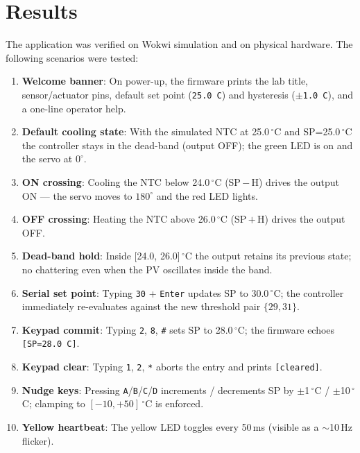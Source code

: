 \documentclass[12pt]{article}
\begin{document}
\section{Results}\label{sec:results}

The application was verified on Wokwi simulation and on physical hardware. The following scenarios were tested:
\begin{enumerate}
  \item \textbf{Welcome banner}: On power-up, the firmware prints the lab title, sensor/actuator pins, default set point (\texttt{25.0\,C}) and hysteresis (\texttt{$\pm$1.0\,C}), and a one-line operator help.
  \item \textbf{Default cooling state}: With the simulated NTC at 25.0\,$^{\circ}$C and SP=25.0\,$^{\circ}$C the controller stays in the dead-band (output OFF); the green LED is on and the servo at $0^{\circ}$.
  \item \textbf{ON crossing}: Cooling the NTC below 24.0\,$^{\circ}$C (SP\,$-$\,H) drives the output ON --- the servo moves to $180^{\circ}$ and the red LED lights.
  \item \textbf{OFF crossing}: Heating the NTC above 26.0\,$^{\circ}$C (SP\,$+$\,H) drives the output OFF.
  \item \textbf{Dead-band hold}: Inside [24.0, 26.0]\,$^{\circ}$C the output retains its previous state; no chattering even when the PV oscillates inside the band.
  \item \textbf{Serial set point}: Typing \texttt{30} + \texttt{Enter} updates SP to 30.0\,$^{\circ}$C; the controller immediately re-evaluates against the new threshold pair $\{29, 31\}$.
  \item \textbf{Keypad commit}: Typing \texttt{2}, \texttt{8}, \texttt{\#} sets SP to 28.0\,$^{\circ}$C; the firmware echoes \texttt{[SP=28.0 C]}.
  \item \textbf{Keypad clear}: Typing \texttt{1}, \texttt{2}, \texttt{*} aborts the entry and prints \texttt{[cleared]}.
  \item \textbf{Nudge keys}: Pressing \texttt{A}/\texttt{B}/\texttt{C}/\texttt{D} increments / decrements SP by $\pm$1\,$^{\circ}$C / $\pm$10\,$^{\circ}$C; clamping to $[-10, +50]\,^{\circ}$C is enforced.
  \item \textbf{Yellow heartbeat}: The yellow LED toggles every 50\,ms (visible as a $\sim$10\,Hz flicker).
\end{enumerate}
\end{document}
